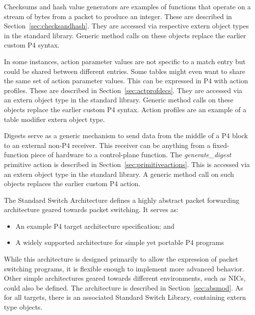 \documentclass[12pt]{article}
\begin{document}
Checksums and hash value generators are examples of functions that operate on a
stream of bytes from a packet to produce an integer.  These are described
in Section~\ref{sec:checksandhash}.   They are accessed via respective extern
object types in the standard library.  Generic method calls on these objects
replace the earlier custom P4 syntax.


In some instances, action parameter values are not specific to a match entry but
could be shared between different entries. Some tables might even want to share
the same set of action parameter values. This can be expressed in P4 with
action profiles.  These are described in Section~\ref{sec:actprofdecs}.  They
are accessed via an extern object type in the standard library.
Generic method calls on these objects replace the earlier custom P4 syntax.
Action profiles are an example of a table modifier extern object type.


Digests serve as a generic mechanism to send data from the middle of a P4 block
to an external non-P4 receiver. This receiver can be anything from a
fixed-function piece of hardware to a control-plane function.  The
\textit{generate_digest} primitive action is described in
Section~\ref{sec:primitiveactions}.  This is accessed via an extern object
type in the standard library.  A generic method call on such objects replaces
the earlier custom P4 action.



The Standard Switch Architecture defines a highly abstract packet forwarding
architecture geared towards packet switching.  It serves as:
\begin{itemize}
\item
An example P4 target architecture specification; and
\item
A widely supported architecture for simple yet portable P4 programs
\end{itemize}
While this architecture is designed primarily to allow the expression of packet
switching programs, it is flexible enough to implement more advanced behavior.
Other simple architectures geared towards different environments, such as NICs,
could also be defined.  The architecture is described in
Section~\ref{sec:absmod}.  As for all targets, there is an associated
Standard Switch Library, containing extern type objects.
\end{document}
